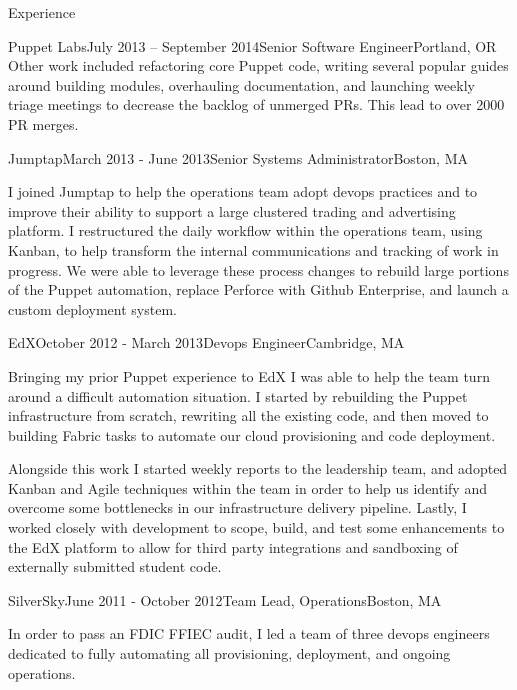 \documentclass{resume} %
\begin{document}
\begin{rSection}{Experience}
\begin{rSubsection}{Puppet Labs}{July 2013 -- September 2014}{Senior Software Engineer}{Portland, OR}
Other work included refactoring core Puppet code, writing several popular guides around building modules, overhauling documentation, and launching weekly triage meetings to decrease the backlog of unmerged PRs.  This lead to over 2000 PR merges.
\end{rSubsection}


\begin{rSubsection}{Jumptap}{March 2013 - June 2013}{Senior Systems Administrator}{Boston, MA}
\item[] I joined Jumptap to help the operations team adopt devops practices and to improve their ability to support a large clustered trading and advertising platform.  I restructured the daily workflow within the operations team, using Kanban, to help transform the internal communications and tracking of work in progress.  We were able to leverage these process changes to rebuild large portions of the Puppet automation, replace Perforce with Github Enterprise, and launch a custom deployment system.

\end{rSubsection}


\begin{rSubsection}{EdX}{October 2012 - March 2013}{Devops Engineer}{Cambridge, MA}
\item[] Bringing my prior Puppet experience to EdX I was able to help the team turn around a difficult automation situation.  I started by rebuilding the Puppet infrastructure from scratch, rewriting all the existing code, and then moved to building Fabric tasks to automate our cloud provisioning and code deployment.

Alongside this work I started weekly reports to the leadership team, and adopted  Kanban and Agile techniques within the team in order to help us identify and overcome some bottlenecks in our infrastructure delivery pipeline.  Lastly, I worked closely with development to scope, build, and test some enhancements to the EdX platform to allow for third party integrations and sandboxing of externally submitted student code.
\end{rSubsection}

\begin{rSubsection}{SilverSky}{June 2011 - October 2012}{Team Lead, Operations}{Boston, MA}
\item[] In order to pass an FDIC FFIEC audit, I led a team of three devops engineers dedicated to fully automating all provisioning, deployment, and ongoing operations.


\end{rSubsection}
\end{rSection}
\end{document}
